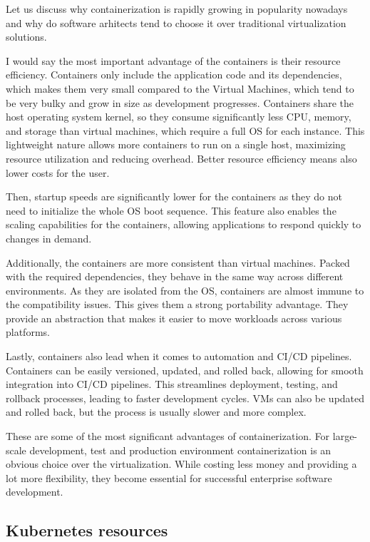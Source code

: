 Let us discuss why containerization is rapidly growing in popularity nowadays and why do software arhitects tend to choose it over traditional virtualization solutions.

I would say the most important advantage of the containers is their resource efficiency. Containers only include the application code and its dependencies, which makes them very small compared to the Virtual Machines, which tend to be very bulky and grow in size as development progresses. Containers share the host operating system kernel, so they consume significantly less CPU, memory, and storage than virtual machines, which require a full OS for each instance. This lightweight nature allows more containers to run on a single host, maximizing resource utilization and reducing overhead. Better resource efficiency means also lower costs for the user.

Then, startup speeds are significantly lower for the containers as they do not need to initialize the whole OS boot sequence. This feature also enables the scaling capabilities for the containers, allowing applications to respond quickly to changes in demand.

Additionally, the containers are more consistent than virtual machines. Packed with the required dependencies, they behave in the same way across different environments. As they are isolated from the OS, containers are almost immune to the compatibility issues. This gives them a strong portability advantage. They provide an abstraction that makes it easier to move workloads across various platforms.

Lastly, containers also lead when it comes to automation and CI/CD pipelines. Containers can be easily versioned, updated, and rolled back, allowing for smooth integration into CI/CD pipelines. This streamlines deployment, testing, and rollback processes, leading to faster development cycles. VMs can also be updated and rolled back, but the process is usually slower and more complex.

These are some of the most significant advantages of containerization. For large-scale development, test and production environment containerization is an obvious choice over the virtualization. While costing less money and providing a lot more flexibility, they become essential for successful enterprise software development.

\subsection{Kubernetes resources}

